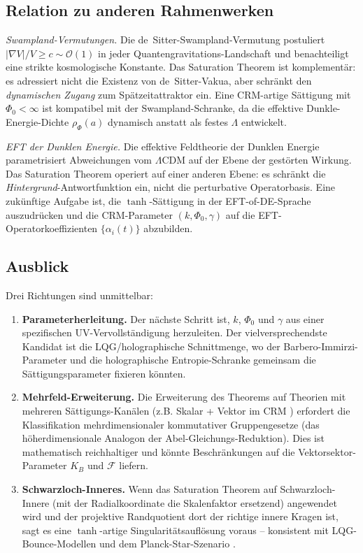 \documentclass[aps,prd,twocolumn,superscriptaddress,nofootinbib]{revtex4-2}
\begin{document}
\subsection{Relation zu anderen Rahmenwerken}

\textit{Swampland-Vermutungen.} Die de~Sitter-Swampland-Vermutung \cite{Obied2018} postuliert $|\nabla V|/V \geq c \sim \mathcal{O}(1)$ in jeder Quantengravitations-Landschaft und benachteiligt eine strikte kosmologische Konstante. Das Saturation Theorem ist komplementär: es adressiert nicht die Existenz von de~Sitter-Vakua, aber schränkt den \textit{dynamischen Zugang} zum Spätzeitattraktor ein. Eine CRM-artige Sättigung mit $\Phi_0 < \infty$ ist kompatibel mit der Swampland-Schranke, da die effektive Dunkle-Energie-Dichte $\rho_\Phi(a)$ dynamisch anstatt als festes $\Lambda$ entwickelt.

\textit{EFT der Dunklen Energie.} Die effektive Feldtheorie der Dunklen Energie \cite{Gubitosi2013} parametrisiert Abweichungen vom $\Lambda$CDM auf der Ebene der gestörten Wirkung. Das Saturation Theorem operiert auf einer anderen Ebene: es schränkt die \textit{Hintergrund}-Antwortfunktion ein, nicht die perturbative Operatorbasis. Eine zukünftige Aufgabe ist, die $\tanh$-Sättigung in der EFT-of-DE-Sprache auszudrücken und die CRM-Parameter $(k, \Phi_0, \gamma)$ auf die EFT-Operatorkoeffizienten $\{\alpha_i(t)\}$ abzubilden.

\subsection{Ausblick}

Drei Richtungen sind unmittelbar:

\begin{enumerate}
\item \textbf{Parameterherleitung.} Der nächste Schritt ist, $k$, $\Phi_0$ und $\gamma$ aus einer spezifischen UV-Vervollständigung herzuleiten. Der vielversprechendste Kandidat ist die LQG/holographische Schnittmenge, wo der Barbero-Immirzi-Parameter und die holographische Entropie-Schranke gemeinsam die Sättigungsparameter fixieren könnten.

\item \textbf{Mehrfeld-Erweiterung.} Die Erweiterung des Theorems auf Theorien mit mehreren Sättigungs-Kanälen (z.B. Skalar + Vektor im CRM \cite{Geiger2026d}) erfordert die Klassifikation mehrdimensionaler kommutativer Gruppengesetze (das höherdimensionale Analogon der Abel-Gleichungs-Reduktion). Dies ist mathematisch reichhaltiger und könnte Beschränkungen auf die Vektorsektor-Parameter $K_B$ und $\mathcal{F}$ liefern.

\item \textbf{Schwarzloch-Inneres.} Wenn das Saturation Theorem auf Schwarzloch-Innere (mit der Radialkoordinate die Skalenfaktor ersetzend) angewendet wird und der projektive Randquotient dort der richtige innere Kragen ist, sagt es eine $\tanh$-artige Singularitätsauflösung voraus -- konsistent mit LQG-Bounce-Modellen \cite{Ashtekar2006} und dem Planck-Star-Szenario \cite{Rovelli2014}.
\end{enumerate}
\end{document}
